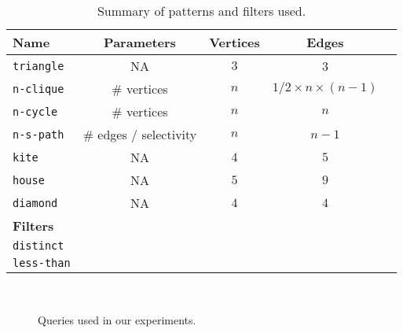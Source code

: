 \begin{table}[]
    \centering
    \begin{tabular}{@{}lcccp{6cm}@{}}
        \toprule
        Name     & Parameters                 & Vertices & Edges

        \\ \midrule
        \texttt{triangle} & NA                          & $3$        & 3                 \\
        \texttt{n-clique} & \# vertices                & $n$        & $1/2 \times n \times (n - 1)$ \\
        \texttt{n-cycle}  & \# vertices                & $n$        & $n$                 \\
        \texttt{n-s-path} & \# edges / selectivity  & $n$       & $n - 1$                 \\
    \texttt{kite}  & NA                         & $4$        & $5$                    \\
        \texttt{house}    & NA                         & $5$        & $9$                 \\
        \texttt{diamond}  & NA                         & $4$        & $4$                 \\
        \textbf{Filters}   &                            &          &                   \\
        \texttt{distinct}  &                            &          &                   \\
        \texttt{less-than} &                            &          &                   \\ \bottomrule
    \end{tabular}
    \caption{Summary of patterns and filters used.}
    \label{table:patterns}
\end{table}

\begin{figure}
    \centering
    \subfloat[triangle]{}
    \subfloat[4-clique]{}
    \subfloat[5-clique]{}
    \subfloat[4-cycle]{}\\
    \subfloat[5-cycle]{}
    \subfloat[diamond]{}
    \subfloat[kite]{}
    \caption{Queries used in our experiments.}
    \label{fig:all-queries}
\end{figure}

